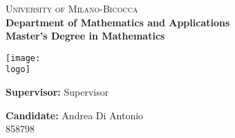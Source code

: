 \begin{titlepage}
    \thispagestyle{fancy}
    \fancyhf{}
	\fancyhead[C]{}

    \centering
    
    \begin{minipage}[t]{1\textwidth}
        \centering
        \huge{\textsc{University of Milano-Bicocca}} \\
        \large{\textbf{Department of Mathematics and Applications}} \\
        \large{\textbf{Master's Degree in Mathematics}} \\
    \end{minipage}
    
    \vspace{10mm}
        
    \centering
    \begin{minipage}[t]{1\textwidth}
    \centering
    \texttt{[image: \\logo]}
    \end{minipage}
    
    \vspace{10mm}
    
    \begin{center}
        \huge{\textbf{\documenttitle}}
    \end{center}
    
    \vspace{10mm}

    \begin{flushleft}
        \noindent \large{\textbf{Supervisor:} Supervisor} \\
    \end{flushleft}
    
    \vspace{10mm}

    \begin{flushright}
        \large{ \textbf{Candidate:} Andrea Di Antonio \\ 858798} %
    \end{flushright}
\end{titlepage}
